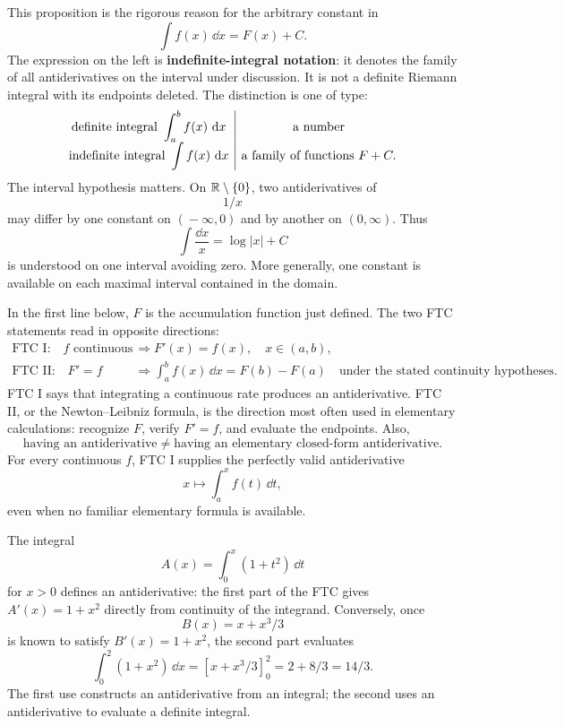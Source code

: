 This proposition is the rigorous reason for the arbitrary constant in
\[
\int f(x)\,\dd x=F(x)+C.
\]
The expression on the left is \textbf{indefinite-integral notation}: it
denotes the family of all antiderivatives on the interval under discussion.
It is not a definite Riemann integral with its endpoints deleted. The
distinction is one of type:
\[
\begin{array}{c|c}
\text{definite integral }\displaystyle\int_a^b f(x)\,\mathop{}\!\mathrm{d} x
&\text{a number}\cr
\text{indefinite integral }\displaystyle\int f(x)\,\mathop{}\!\mathrm{d} x
&\text{a family of functions }F+C.
\end{array}
\]
The interval hypothesis matters. On \(\mathbb{R}\setminus\{0\}\), two
antiderivatives of
\[
1/x
\]
 may differ by one constant on
\((\! -\infty,0)\) and by another on \((0,\infty)\). Thus
\[
\int\frac{\dd x}{x}=\log|x|+C
\]
is understood on one interval avoiding zero. More generally, one constant
is available on each maximal interval contained in the domain.

In the first line below, $F$ is the accumulation function just defined.
The two FTC statements read in opposite directions:
\[
\boxed{
\begin{aligned}
\text{FTC I:}\quad
f\text{ continuous}
&\Longrightarrow
F'(x)=f(x),\quad x\in(a,b),\\
\text{FTC II:}\quad
F'=f
&\Longrightarrow
\int_a^b f(x)\,\dd x=F(b)-F(a)
\quad\text{under the stated continuity hypotheses.}
\end{aligned}}
\]
FTC I says that integrating a continuous rate produces an antiderivative.
FTC II, or the Newton--Leibniz formula, is the direction most often used in
elementary calculations: recognize \(F\), verify \(F'=f\), and evaluate the
endpoints. Also,
\[
\boxed{\text{having an antiderivative}
\ne
\text{having an elementary closed-form antiderivative}.}
\]
For every continuous \(f\), FTC I supplies the perfectly valid
antiderivative
\[
x\mapsto\int_a^x f(t)\,\dd t,
\]
 even when no familiar
elementary formula is available.

\begin{example}
The integral
\[
A(x)=\int_0^x(1+t^2)\,\dd t
\]
 for $x>0$ defines an antiderivative:
the first part of the FTC gives $A'(x)=1+x^2$ directly from continuity
of the integrand. Conversely, once
\[
B(x)=x+x^3/3
\]
 is known to satisfy
$B'(x)=1+x^2$, the second part evaluates
\[
\int_0^2(1+x^2)\,\dd x=[x+x^3/3]_0^2=2+8/3=14/3.
\]
The first use constructs an antiderivative from an integral; the second
uses an antiderivative to evaluate a definite integral.
\end{example}

